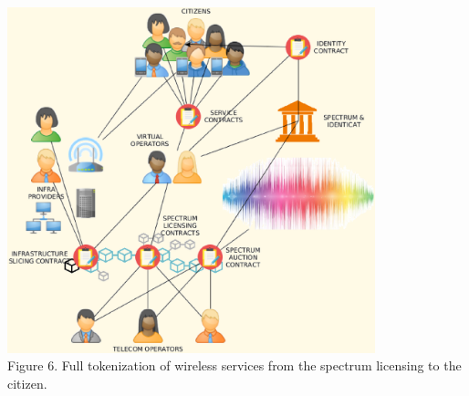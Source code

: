 \documentclass[12pt]{amsart}
\begin{document}
\begin{center}
  \includegraphics[keepaspectratio, width=0.8\textwidth]{images/bc5g/beyond-y.eps}
\\
Figure 6. Full tokenization of wireless services from
the spectrum licensing to the citizen.
\\
\end{center}
\end{document}
